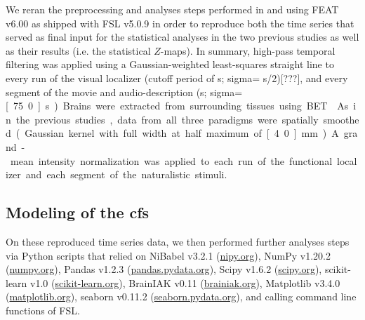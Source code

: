 %
We reran the preprocessing and analyses steps performed in
\citet{sengupta2016extension} and \citet{haeusler2022processing} using FEAT
v6.00 \citep[FMRI Expert Analysis Tool;][]{woolrich2001autocorr} as shipped with
FSL v5.0.9 \citep[\href{https://www.fmrib.ox.ac.uk/fsl}{FMRIB's Software
Library;}][]{smith2004fsl} in order to reproduce both the time series that
served as final input for the statistical analyses in the two previous studies
as well as their results (i.e. the statistical $Z$-maps).
In summary, high-pass temporal filtering was applied using a Gaussian-weighted
least-squares straight line to every run of the visual localizer (cutoff period
of \unit[100]{s}; sigma= \unit[100]{s}/2)[???], and every segment of the movie
and audio-description (\unit[150]{s}; sigma=\unit[75.0]{s}).
Brains were extracted from surrounding tissues using BET \citep{smith2002bet}.
As in the previous studies, data from all three paradigms were spatially
smoothed (Gaussian kernel with full width at half maximum of \unit[4.0]{mm}).
A grand-mean intensity normalization was applied to each run of the functional
localizer and each segment of the naturalistic stimuli.


\subsection{Modeling of the \ac{cfs}}

On these reproduced time series data, we then performed further analyses steps
via Python scripts that relied on
%
NiBabel v3.2.1 (\href{https://nipy.org}{\url{nipy.org}}),
%
NumPy v1.20.2 (\href{https://numpy.org}{\url{numpy.org}}),
%
Pandas v1.2.3 (\href{https://pandas.pydata.org}{\url{pandas.pydata.org}}),
%
Scipy v1.6.2 (\href{https://scipy.org}{\url{scipy.org}}),
%
scikit-learn v1.0 (\href{https://scikit-learn.org}{\url{scikit-learn.org}}),
%
BrainIAK v0.11 (\href{https://brainiak.org}{\url{brainiak.org}}),
%
Matplotlib v3.4.0 (\href{https://matplotlib.org}{\url{matplotlib.org}}),
%
seaborn v0.11.2 (\href{https://seaborn.pydata.org}{\url{seaborn.pydata.org}}),
%
and calling command line functions of FSL.




